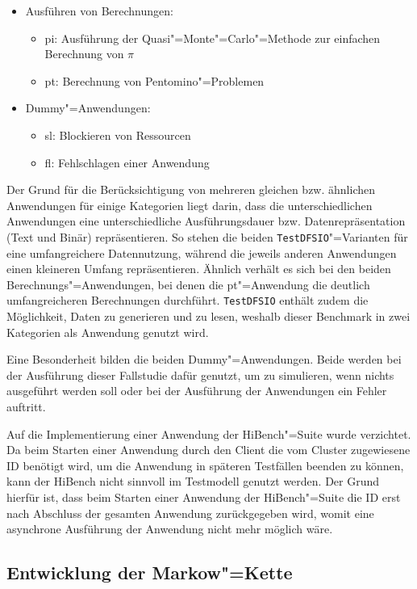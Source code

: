 \begin{itemize}
    \item Ausführen von Berechnungen:
    \begin{itemize}
        \item \acl{pi}: Ausführung der Quasi"=Monte"=Carlo"=Methode zur einfachen Berechnung von $\pi$
        \item \ac{pt}: Berechnung von Pentomino"=Problemen
    \end{itemize}

    \item Dummy"=Anwendungen:
    \begin{itemize}
        \item  \ac{sl}: Blockieren von Ressourcen
        \item  \ac{fl}: Fehlschlagen einer Anwendung
    \end{itemize}
\end{itemize}

Der Grund für die Berücksichtigung von mehreren gleichen bzw. ähnlichen Anwendungen für einige Kategorien liegt darin, dass die unterschiedlichen Anwendungen eine unterschiedliche Ausführungsdauer bzw. Datenrepräsentation (Text und Binär) repräsentieren.
So stehen die beiden \texttt{TestDFSIO}"=Varianten für eine umfangreichere Datennutzung, während die jeweils anderen Anwendungen einen kleineren Umfang repräsentieren.
Ähnlich verhält es sich bei den beiden Berechnungs"=Anwendungen, bei denen die \acl{pt}"=Anwendung die deutlich umfangreicheren Berechnungen durchführt.
\texttt{TestDFSIO} enthält zudem die Möglichkeit, Daten zu generieren und zu lesen, weshalb dieser Benchmark in zwei Kategorien als Anwendung genutzt wird.

Eine Besonderheit bilden die beiden Dummy"=Anwendungen.
Beide werden bei der Ausführung dieser Fallstudie dafür genutzt, um zu simulieren, wenn nichts ausgeführt werden soll oder bei der Ausführung der Anwendungen ein Fehler auftritt.

Auf die Implementierung einer Anwendung der HiBench"=Suite wurde verzichtet.
Da beim Starten einer Anwendung durch den Client die vom Cluster zugewiesene ID benötigt wird, um die Anwendung in späteren Testfällen beenden zu können, kann der HiBench nicht sinnvoll im Testmodell genutzt werden.
Der Grund hierfür ist, dass beim Starten einer Anwendung der HiBench"=Suite die ID erst nach Abschluss der gesamten Anwendung zurückgegeben wird, womit eine asynchrone Ausführung der Anwendung nicht mehr möglich wäre.

\subsection{Entwicklung der Markow"=Kette}
\label{subsec:markovChain}


